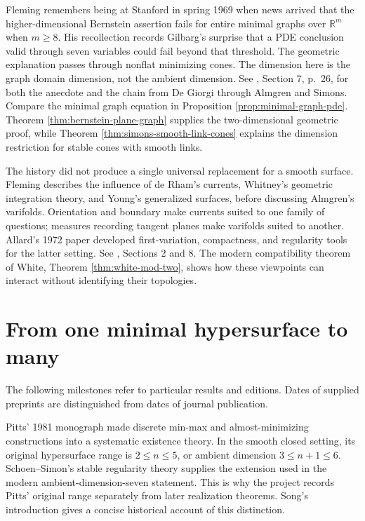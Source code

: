 \begin{remark}\label{hist:bernstein}
Fleming remembers being at Stanford in spring 1969 when news arrived that the higher-dimensional Bernstein assertion fails for entire minimal graphs over $\mathbb R^m$ when $m\geq8$. His recollection records Gilbarg's surprise that a PDE conclusion valid through seven variables could fail beyond that threshold. The geometric explanation passes through nonflat minimizing cones. The dimension here is the graph domain dimension, not the ambient dimension. See \cite{Fle15}, Section 7, p.~26, for both the anecdote and the chain from De Giorgi through Almgren and Simons. Compare the minimal graph equation in Proposition \ref{prop:minimal-graph-pde}. Theorem \ref{thm:bernstein-plane-graph} supplies the two-dimensional geometric proof, while Theorem \ref{thm:simons-smooth-link-cones} explains the dimension restriction for stable cones with smooth links.
\end{remark}

\begin{remark}\label{hist:generalized-surfaces}
The history did not produce a single universal replacement for a smooth surface. Fleming describes the influence of de Rham's currents, Whitney's geometric integration theory, and Young's generalized surfaces, before discussing Almgren's varifolds. Orientation and boundary make currents suited to one family of questions; measures recording tangent planes make varifolds suited to another. Allard's 1972 paper \cite{Allard72} developed first-variation, compactness, and regularity tools for the latter setting. See \cite{Fle15}, Sections 2 and 8. The modern compatibility theorem of White, Theorem \ref{thm:white-mod-two}, shows how these viewpoints can interact without identifying their topologies.
\end{remark}

\chapter{From one minimal hypersurface to many}\label{sec:history-minmax}
The following milestones refer to particular results and editions. Dates of supplied preprints are distinguished from dates of journal publication.

\begin{remark}\label{hist:pitts-dimensions}
Pitts' 1981 monograph \cite{Pitts81} made discrete min-max and almost-minimizing constructions into a systematic existence theory. In the smooth closed setting, its original hypersurface range is $2\leq n\leq5$, or ambient dimension $3\leq n+1\leq6$. Schoen--Simon's stable regularity theory \cite{SS81} supplies the extension used in the modern ambient-dimension-seven statement. This is why the project records Pitts' original range separately from later realization theorems. Song's introduction \cite{Song18} gives a concise historical account of this distinction.
\end{remark}

